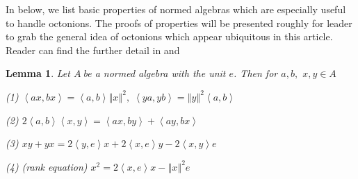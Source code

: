 \documentclass[a4paper]{article}%
\newtheorem{lemma}[theorem]{Lemma}
\begin{document}
In below, we list basic properties of normed algebras which are especially
useful to handle octonions. The proofs of properties will be presented roughly
for leader to grab the general idea of octonions which appear ubiquitous in
this article. Reader can find the further detail in \cite{Spr} and \cite{Har}

\begin{lemma}
\label{OCTBasicLemma}Let $A\ $be a normed algebra with the unit $e$. Then for
$a,b,$ $x,y\in A$

(1) $\left\langle ax,bx\right\rangle =\left\langle a,b\right\rangle \left\Vert
x\right\Vert ^{2},\;\left\langle ya,yb\right\rangle =\left\Vert y\right\Vert
^{2}\left\langle a,b\right\rangle $

(2) $2\left\langle a,b\right\rangle \left\langle x,y\right\rangle
=\left\langle ax,by\right\rangle +\left\langle ay,bx\right\rangle $

(3) $xy+yx=2\left\langle y,e\right\rangle x+2\left\langle x,e\right\rangle
y-2\left\langle x,y\right\rangle e$

(4) (\textit{rank equation}) $x^{2}=2\left\langle x,e\right\rangle
x-\left\Vert x\right\Vert ^{2}e$ $\;$
\end{lemma}
\end{document}

